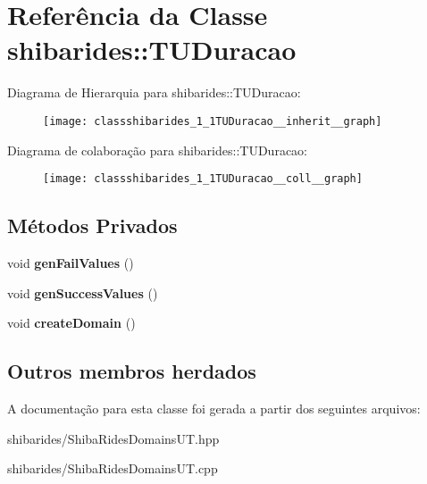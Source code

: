 \hypertarget{classshibarides_1_1TUDuracao}{}\section{Referência da Classe shibarides\+:\+:T\+U\+Duracao}
\label{classshibarides_1_1TUDuracao}


Diagrama de Hierarquia para shibarides\+:\+:T\+U\+Duracao\+:\nopagebreak
\begin{figure}[H]
\begin{center}
\leavevmode
\texttt{[image: classshibarides\_1\_1TUDuracao\_\_inherit\_\_graph]}
\end{center}
\end{figure}


Diagrama de colaboração para shibarides\+:\+:T\+U\+Duracao\+:\nopagebreak
\begin{figure}[H]
\begin{center}
\leavevmode
\texttt{[image: classshibarides\_1\_1TUDuracao\_\_coll\_\_graph]}
\end{center}
\end{figure}
\subsection*{Métodos Privados}
\begin{DoxyCompactItemize}
\item 
void {\bfseries gen\+Fail\+Values} ()\hypertarget{classshibarides_1_1TUDuracao_a49a7dccfce35de965662c08f26c372d2}{}\label{classshibarides_1_1TUDuracao_a49a7dccfce35de965662c08f26c372d2}

\item 
void {\bfseries gen\+Success\+Values} ()\hypertarget{classshibarides_1_1TUDuracao_a0e7275c8389a482481298cd86b1e8399}{}\label{classshibarides_1_1TUDuracao_a0e7275c8389a482481298cd86b1e8399}

\item 
void {\bfseries create\+Domain} ()\hypertarget{classshibarides_1_1TUDuracao_a68ac6e49315658e523585acf1b1ec238}{}\label{classshibarides_1_1TUDuracao_a68ac6e49315658e523585acf1b1ec238}

\end{DoxyCompactItemize}
\subsection*{Outros membros herdados}


A documentação para esta classe foi gerada a partir dos seguintes arquivos\+:\begin{DoxyCompactItemize}
\item 
shibarides/Shiba\+Rides\+Domains\+U\+T.\+hpp\item 
shibarides/Shiba\+Rides\+Domains\+U\+T.\+cpp\end{DoxyCompactItemize}
